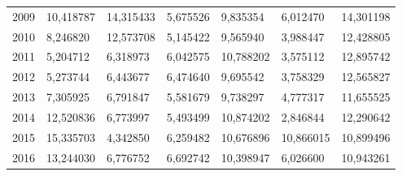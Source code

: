 \begin{table}
\begin{tabular}{p{1cm}p{2cm}p{2cm}p{2cm}p{2cm}p{2cm}p{2cm}}
 2009 &                10,418787 &                           14,315433 &                  5,675526 &                           9,835354 &                            6,012470 &                           14,301198 \\
 2010 &                 8,246820 &                           12,573708 &                  5,145422 &                           9,565940 &                            3,988447 &                           12,428805 \\
 2011 &                 5,204712 &                            6,318973 &                  6,042575 &                          10,788202 &                            3,575112 &                           12,895742 \\
 2012 &                 5,273744 &                            6,443677 &                  6,474640 &                           9,695542 &                            3,758329 &                           12,565827 \\
 2013 &                 7,305925 &                            6,791847 &                  5,581679 &                           9,738297 &                            4,777317 &                           11,655525 \\
 2014 &                12,520836 &                            6,773997 &                  5,493499 &                          10,874202 &                            2,846844 &                           12,290642 \\
 2015 &                15,335703 &                            4,342850 &                  6,259482 &                          10,676896 &                           10,866015 &                           10,899496 \\
 2016 &                13,244030 &                            6,776752 &                  6,692742 &                          10,398947 &                            6,026600 &                           10,943261 \\
\bottomrule
\end{tabular}
\end{table}
